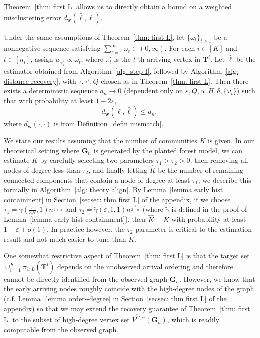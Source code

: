 \documentclass[twoside,11pt]{article}
\theoremstyle{remark}
\begin{document}
Theorem~\ref{thm: first L} allows us to directly obtain a bound on a weighted misclustering error $d_{\bm{w}}(\hat{\ell}, \ell)$. 

\begin{corollary}
\label{cor: weighted distance}
Under the same assumptions of Theorem~\ref{thm: first L}, let $\{\omega_t\}_{t\geq1}$ be a nonnegative sequence satisfying $\sum_{t=1}^{\infty} \omega_t \in(0,\infty)$.
For each $i\in[K]$ and $t\in[n_i]$, assign
$w_{\pi_t^i} \propto \omega_t$, where $\pi_t^i$ is the
$t$-th arriving vertex in $\bm T^i$.
Let $\hat{\ell}$ be the estimator obtained from Algorithm~\ref{alg: step I}, followed by Algorithm~\ref{alg: distance recovery}, with $\tau,\tau',Q$ chosen as in Theorem~\ref{thm: first L}. Then there exists a deterministic sequence $a_n\to0$ (dependent only on $\varepsilon, Q, \alpha, H, \delta, \{\omega_t\}$) such that with probability at least $1-2\varepsilon$,
%
\begin{equation}
\label{cor: weighted distance eqn 1}
d_{\bm{w}}(\ell,\hat{\ell})\leq a_n,
\end{equation}
%
where $d_{\bm{w}}(\cdot, \cdot)$ is from Definition~\ref{defin mismatch}.
\end{corollary}




\begin{remark}
\label{rem: K estimation 2}
We state our results assuming that the number of communities $K$ is given. In our theoretical setting where $\bm{G}_n$ is generated by the planted forest model, we can estimate $K$ by carefully selecting two parameters $\tau_1 > \tau_2 > 0$, then removing all nodes of degree less than $\tau_2$, and finally letting $\hat{K}$ be the number of remaining connected components that contain a node of degree at least $\tau_1$; we describe this formally in Algorithm~\ref{alg: theory align}. By Lemma~\ref{lemma early hist containment} in Section~\ref{secsec: thm first L} of the appendix, if we choose $\tau_1 = \gamma(\frac{\varepsilon}{3H}, 1) n^{\frac{1}{2+\alpha}}$ and $\tau_2 = \tilde{\gamma}(\varepsilon, 1, 1) n^{\frac{1}{2+\alpha}}$ (where $\tilde{\gamma}$ is defined in the proof of Lemma~\ref{lemma early hist containment}), then $\hat{K} = K$ with probability at least $1 - \varepsilon + o(1)$. In practice however, the $\tau_2$ parameter is critical to the estimation result and not much easier to tune than $K$.
\end{remark}




One somewhat restrictive aspect of Theorem~\ref{thm: first L} is that the target set $\cup_{i=1}^K \pi_{1:L}\left(\bm{T}^i\right)$ depends on the unobserved arrival ordering and therefore cannot be directly identified from the observed graph $\bm{G}_n$. However, we know that the early arriving nodes roughly coincide with the high-degree nodes of the graph (c.f. Lemma~\ref{lemma order--degree} in Section~\ref{secsec: thm first L} of the appendix) so that we may extend the recovery guarantee of Theorem~\ref{thm: first L} to the subset of high-degree vertex set $V^{\tilde C,\alpha}(\bm{G}_n)$, which is readily computable from the observed graph. 
\end{document}
